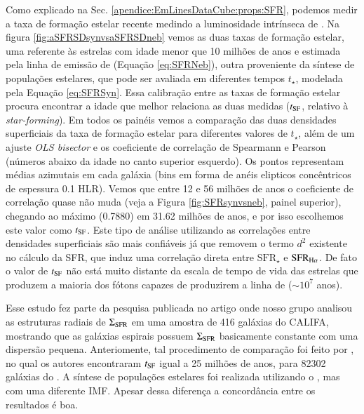 Como explicado na Sec. \ref{apendice:EmLinesDataCube:props:SFR}, podemos medir a taxa de formação estelar recente medindo a luminosidade intrínseca de \Ha. Na figura \ref{fig:aSFRSDsynvsaSFRSDneb} vemos as duas taxas de formação estelar, uma referente às estrelas com idade menor que 10 milhões de anos e estimada pela linha de emissão de \Ha (Equação \ref{eq:SFRNeb}), outra proveniente da síntese de populações estelares, que pode ser avaliada em diferentes tempos $t_\star$, modelada pela Equação \ref{eq:SFRSyn}. Essa calibração entre as taxas de formação estelar procura encontrar a idade que melhor relaciona as duas medidas ($t_{\rm SF}$, relativo à {\em star-forming}). Em todos os painéis vemos a comparação das duas densidades superficiais da taxa de formação estelar para diferentes valores de $t_\star$, além de um ajuste {\em OLS bisector} e os coeficiente de correlação de Spearmann e Pearson (números abaixo da idade no canto superior esquerdo). Os pontos representam médias azimutais em cada galáxia (bins em forma de anéis elipticos concêntricos de espessura 0.1 HLR). Vemos que entre 12 e 56 milhões de anos o coeficiente de correlação quase não muda (veja a Figura \ref{fig:SFRsynvsneb}, painel superior), chegando ao máximo (0.7880) em 31.62 milhões de anos, e por isso escolhemos este valor como $t_{\rm SF}$. Este tipo de análise utilizando as correlações entre densidades superficiais são mais confiáveis já que removem o termo $d^2$ existente no cálculo da SFR, que induz uma correlação direta entre $\mathrm{SFR}_\star$ e $\mathrm{SFR}_{\Ha}$. De fato o valor de $t_{\rm SF}$ não está muito distante da escala de tempo de vida das estrelas que produzem a maioria dos fótons capazes de produzirem a linha de \Ha ($\sim10^7$ anos).

Esse estudo fez parte da pesquisa publicada no artigo \citep{GonzalezDelgado.etal.2016a} onde nosso grupo analisou as estruturas radiais de $\Sigma_{\rm SFR}$ em uma amostra de 416 galáxias do CALIFA, mostrando que as galáxias espirais possuem $\Sigma_{\rm SFR}$ basicamente constante com uma dispersão pequena. Anteriomente, tal procedimento de comparação foi feito por \citet{Asari.etal.2007a}, no qual os autores encontraram $t_{\rm SF}$ igual a 25 milhões de anos, para 82302 galáxias do \SDSS. A síntese de populações estelares foi realizada utilizando o \starlight, mas com uma diferente IMF. Apesar dessa diferença a concordância entre os resultados é boa.


